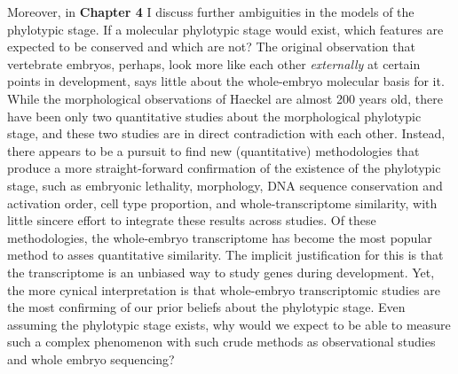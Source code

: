 Moreover, in \textbf{Chapter 4} I discuss further ambiguities in the models of the phylotypic stage. If a molecular phylotypic stage would exist, which features are expected to be conserved and which are not? The original observation that vertebrate embryos, perhaps, look more like each other \textit{externally} at certain points in development, says little about the whole-embryo molecular basis for it. While the morphological observations of Haeckel are almost 200 years old, there have been only two quantitative studies about the morphological phylotypic stage, and these two studies are in direct contradiction with each other. Instead, there appears to be a pursuit to find new (quantitative) methodologies that produce a more straight-forward confirmation of the existence of the phylotypic stage, such as embryonic lethality\cite{Uchida2018}, morphology\cite{OlafRP2003,Cordero2020}, DNA sequence conservation\cite{Piasecka2013,Quint2012,Liu2021} and activation order\cite{Uesaka2019}, cell type proportion\cite{Mayshar2023}, and whole-transcriptome similarity\cite{Piasecka2013,Irie2011,marletaz2018,Liu2020,Leong2021,PerezPosada2022,Kalinka2010}, with little sincere effort to integrate these results across studies. Of these methodologies, the whole-embryo transcriptome has become the most popular method to asses quantitative similarity. The implicit justification for this is that the transcriptome is an unbiased way to study genes during development. Yet, the more cynical interpretation is that whole-embryo transcriptomic studies are the most confirming of our prior beliefs about the phylotypic stage. Even assuming the phylotypic stage exists, why would we expect to be able to measure such a complex phenomenon with such crude methods as observational studies and whole embryo sequencing? 

